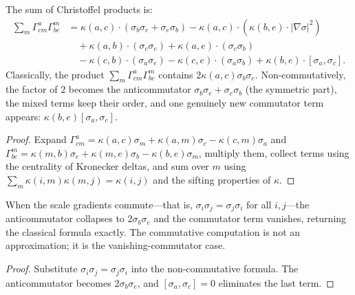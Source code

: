 \begin{theorem}
The sum of Christoffel products is:
\begin{align}
\sum_m \Gamma^a_{cm} \Gamma^m_{be} &= \kappa(a,c) \cdot (\sigma_b \sigma_e + \sigma_e \sigma_b) - \kappa(a,c) \cdot (\kappa(b,e) \cdot |\nabla \sigma|^2) \\
&\quad + \kappa(a,b) \cdot (\sigma_c \sigma_e) + \kappa(a,e) \cdot (\sigma_c \sigma_b) \\
&\quad - \kappa(c,b) \cdot (\sigma_a \sigma_e) - \kappa(c,e) \cdot (\sigma_a \sigma_b) + \kappa(b,e) \cdot [\sigma_a, \sigma_c] .
\end{align}
Classically, the product $\sum_m \Gamma^a_{cm} \Gamma^m_{be}$ contains $2 \kappa(a,c) \sigma_b \sigma_e$. Non-commutatively, the factor of $2$ becomes the anticommutator $\sigma_b \sigma_e + \sigma_e \sigma_b$ (the symmetric part), the mixed terms keep their order, and one genuinely new commutator term appears: $\kappa(b,e) [\sigma_a, \sigma_c]$.
\begin{proof}
Expand $\Gamma^a_{cm} = \kappa(a,c) \sigma_m + \kappa(a,m) \sigma_c - \kappa(c,m) \sigma_a$ and $\Gamma^m_{be} = \kappa(m,b) \sigma_e + \kappa(m,e) \sigma_b - \kappa(b,e) \sigma_m$, multiply them, collect terms using the centrality of Kronecker deltas, and sum over $m$ using $\sum_m \kappa(i,m) \kappa(m,j) = \kappa(i,j)$ and the sifting properties of $\kappa$.
\end{proof}
\end{theorem}

\begin{theorem}
When the scale gradients commute—that is, $\sigma_i \sigma_j = \sigma_j \sigma_i$ for all $i, j$—the anticommutator collapses to $2 \sigma_b \sigma_e$ and the commutator term vanishes, returning the classical formula exactly. The commutative computation is not an approximation; it is the vanishing-commutator case.
\begin{proof}
Substitute $\sigma_i \sigma_j = \sigma_j \sigma_i$ into the non-commutative formula. The anticommutator becomes $2 \sigma_b \sigma_e$, and $[\sigma_a, \sigma_c] = 0$ eliminates the last term.
\end{proof}
\end{theorem}

